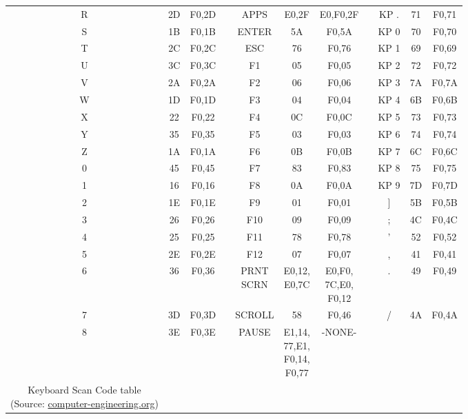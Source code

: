 \documentclass{article}
\makeatletter
\newcommand{\specialcell}[2][c]{%
  \begin{tabular}[#1]{@{}c@{}}#2\end{tabular}}
\makeatother
\begin{document}
\begin{longtable}{|c|c|c|g|c|c|c|g|c|c|c|}
       R & 2D & F0,2D && APPS & E0,2F & E0,F0,2F && KP . & 71 & F0,71 \\
       S & 1B & F0,1B && ENTER & 5A & F0,5A && KP 0 & 70 & F0,70 \\
       T & 2C & F0,2C && ESC & 76 & F0,76 && KP 1 & 69 & F0,69 \\
       U & 3C & F0,3C && F1 & 05 & F0,05 && KP 2 & 72 & F0,72 \\
       V & 2A & F0,2A && F2 & 06 & F0,06 && KP 3 & 7A & F0,7A \\
       W & 1D & F0,1D && F3 & 04 & F0,04 && KP 4 & 6B & F0,6B \\
       X & 22 & F0,22 && F4 & 0C & F0,0C && KP 5 & 73 & F0,73 \\
       Y & 35 & F0,35 && F5 & 03 & F0,03 && KP 6 & 74 & F0,74 \\
       Z & 1A & F0,1A && F6 & 0B & F0,0B && KP 7 & 6C & F0,6C \\
       0 & 45 & F0,45 && F7 & 83 & F0,83 && KP 8 & 75 & F0,75 \\
       1 & 16 & F0,16 && F8 & 0A & F0,0A && KP 9 & 7D & F0,7D \\
       2 & 1E & F0,1E && F9 & 01 & F0,01 && ] & 5B & F0,5B \\
       3 & 26 & F0,26 && F10 & 09 & F0,09 && ; & 4C & F0,4C \\
       4 & 25 & F0,25 && F11 & 78 & F0,78 && ' & 52 & F0,52 \\
       5 & 2E & F0,2E && F12 & 07 & F0,07 && , & 41 & F0,41 \\
       6 & 36 & F0,36 && \specialcell{PRNT\\SCRN} & \specialcell{E0,12,\\E0,7C} & \specialcell{E0,F0,\\7C,E0,\\F0,12} && . & 49 & F0,49 \\
       7 & 3D & F0,3D && {\small SCROLL} & 58 & F0,46 && / & 4A & F0,4A \\
       8 & 3E & F0,3E && PAUSE & \specialcell{E1,14,\\77,E1,\\F0,14,\\F0,77} & -NONE- && & & \\
       \hline
  \caption{Keyboard Scan Code table \\(Source: \href{http://www.computer-engineering.org/ps2keyboard/scancodes2.html}{computer-engineering.org})}
\end{longtable}
\end{document}
